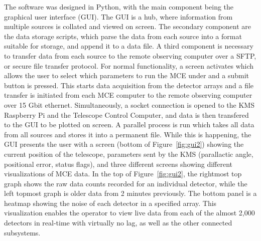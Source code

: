 \documentclass[manuscript]{aastex}
\begin{document}
The software was designed in {\sc Python}, with the main component being the graphical user interface (GUI). The GUI is a hub, where information from multiple sources is collated and viewed on screen. The secondary component are the data storage scripts, which parse the data from each source into a format suitable for storage, and append it to a data file. A third component is necessary to transfer data from each source to the remote observing computer over a {\sc SFTP}, or secure file transfer protocol. For normal functionality, a screen activates which allows the user to select which parameters to run the MCE under and a submit button is pressed. This starts data acquisition from the detector arrays and a file transfer is initiated from each MCE computer to the remote observing computer over 15 Gbit ethernet. Simultaneously, a socket connection is opened to the KMS Raspberry Pi and the Telescope Control Computer, and data is then transfered to the GUI to be plotted on screen. A parallel process is run which takes all data from all sources and stores it into a permanent file. While this is happening, the GUI presents the user with a screen (bottom of Figure~\ref{fig:gui2}) showing the current position of the telescope, parameters sent by the KMS (parallactic angle, positional error, status flags), and three different screens showing different visualizations of MCE data. In the top of Figure~\ref{fig:gui2}, the rightmost top graph shows the raw data counts recorded for an individual detector, while the left topmost graph is older data from 2 minutes previously. The bottom panel is a heatmap showing the noise of each detector in a specified array. This visualization enables the operator to view live data from each of the almost 2,000 detectors in real-time with virtually no lag, as well as the other connected subsystems. 
\end{document}
